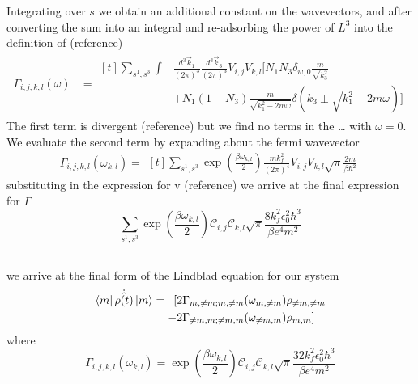 Integrating over \(s\) we obtain
an additional constant on the
wavevectors, and after
converting the sum into
an integral and re-adsorbing
the power of \(L^3\) into the
definition of (reference)
\begin{align}
    \Gamma_{i,j, k,l}(\omega) & =\begin{aligned}[t]
        \sum_{s^1,s^3} \int &
        \frac{d^3\vec{k}_1}{{(2\pi)}^3}
        \frac{d^3\vec{k}_3}{{(2\pi)}^3}
        V_{i,j} V_{k,l} [
        N_1 N_3 \delta_{w, 0} \frac{m}{\sqrt{k_3^2}} \\
                            & + N_1 (1 - N_3)
                \frac{m}{\sqrt{k_1^2 - 2m\omega}}
                \delta({k_3 \pm \sqrt{k_1^2 + 2m\omega}}) ]
    \end{aligned}
\end{align}
The first term is divergent (reference)
but we find no terms in the \ldots
with \(\omega = 0\).
We evaluate the second term
by expanding about the fermi
wavevector
\begin{equation}
    \Gamma_{i,j, k,l}(\omega_{k,l}) =\begin{aligned}[t]
        \sum_{s^1,s^3} \exp{(\frac{\beta \omega_{k,l}}{2})} \frac{m k_f^2 }{{(2\pi)}^4}
        V_{i,j} V_{k,l} \sqrt{\pi} \frac{2m}{\beta \hbar^2}
    \end{aligned}
\end{equation}
substituting in the expression
for v (reference)
we arrive at the final
expression for \(\Gamma \)
\begin{equation}
    \sum_{s^1,s^3} \exp{(\frac{\beta \omega_{k,l}}{2})}
    \mathcal{C}_{i,j} \mathcal{C}_{k,l}
    \sqrt{\pi} \frac{8 k_f^2 \epsilon_0^2 \hbar^3}{\beta e^4 m^2}
\end{equation}

\subsection{}
we arrive at the final form of
the Lindblad equation
for our system
\begin{equation}
    \bra{m}\dot{\hat{\rho{}(t)}} \ket{m} = \begin{aligned}[t]
        [ & 2\Gamma_{m,\neq m;m, \neq m}(\omega_{m,\neq m})\rho_{\neq m, \neq m} \\
        - & 2\Gamma_{\neq m,m;\neq m, m}(\omega_{\neq m,m})\rho_{m, m}]
    \end{aligned}
\end{equation}
where
\begin{equation}
    \Gamma_{i,j, k,l}(\omega_{k,l})   =
    \exp{(\frac{\beta \omega_{k,l}}{2})}
    \mathcal{C}_{i,j} \mathcal{C}_{k,l}
    \sqrt{\pi} \frac{32 k_f^2 \epsilon_0^2 \hbar^3}{\beta e^4 m^2}
\end{equation}

